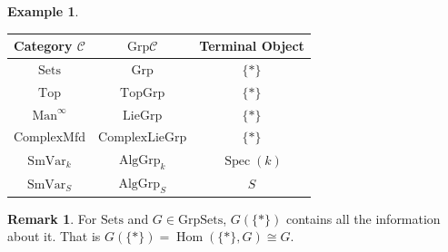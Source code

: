 \documentclass[10pt]{article}
\numberwithin{equation}{section}
\theoremstyle{definition}
\newtheorem{remark}{Remark}[section]
\newtheorem{example}{Example}[section]
\DeclareMathOperator{\Hom}{Hom}
\DeclareMathOperator{\Spec}{Spec}
\newcommand{\sC}[0]{\mathscr{C}}
\newcommand{\Grp}[0]{\mathrm{Grp}}
\begin{document}
\begin{example}$\:$
    \begin{center}
\begin{tabular}{c|c|c}
Category $\mathscr{C}$ & $\mathrm{Grp}\mathscr{C}$ & Terminal Object \\ \hline
$\mathrm{Sets}$        & $\Grp$                    & $\{\ast\}$      \\ \hline
$\mathrm{Top}$         & $\mathrm{TopGrp}$         & $\{\ast\}$      \\ \hline
$\mathrm{Man}^\infty$  & $\mathrm{LieGrp}$         & $\{\ast\}$      \\ \hline
$\mathrm{ComplexMfd}$  & $\mathrm{ComplexLieGrp}$  & $\{\ast\}$      \\ \hline
$\mathrm{SmVar}_k$     & $\mathrm{AlgGrp}_k$       & $\Spec(k)$      \\ \hline
$\mathrm{SmVar}_S$     & $\mathrm{AlgGrp}_S$       & $S$            
\end{tabular}
    \end{center}
\end{example}

\begin{remark}
    For $\mathrm{Sets}$ and $G\in\Grp\mathrm{Sets}$, $G(\{\ast\})$ contains all the information about it. That is $G(\{\ast\}) = \Hom(\{\ast\},G)\cong G$.
\end{remark}

\end{document}
